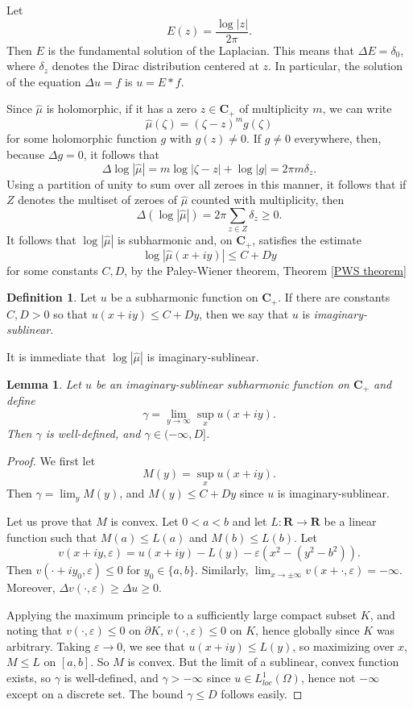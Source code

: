 \documentclass[12pt]{report}
\newcommand{\RR}{\mathbf{R}}
\newcommand{\CC}{\mathbf{C}}
\newcommand{\dfn}[1]{\emph{#1}\index{#1}}
\newtheorem{lemma}[theorem]{Lemma}
\theoremstyle{definition}
\newtheorem{definition}[theorem]{Definition}
\begin{document}
Let
$$E(z) = \frac{\log |z|}{2\pi}.$$
Then $E$ is the fundamental solution of the Laplacian. This means that $\Delta E = \delta_0$, where $\delta_z$ denotes the Dirac distribution centered at $z$. In particular, the solution of the equation $\Delta u = f$ is $u = E*f$.

Since $\hat \mu$ is holomorphic, if it has a zero $z \in \CC_+$ of multiplicity $m$, we can write
$$\hat \mu(\zeta) = (\zeta - z)^m g(\zeta)$$
for some holomorphic function $g$ with $g(z) \neq 0$. If $g \neq 0$ everywhere, then, because $\Delta g = 0$, it follows that
$$\Delta \log |\hat \mu| = m\log |\zeta - z| + \log |g| = 2\pi m \delta_z.$$
Using a partition of unity to sum over all zeroes in this manner, it follows that if $Z$ denotes the multiset of zeroes of $\hat \mu$ counted with multiplicity, then
$$\Delta(\log |\hat \mu|) = 2\pi \sum_{z \in Z} \delta_z \geq 0.$$
It follows that $\log |\hat \mu|$ is subharmonic and, on $\CC_+$, satisfies the estimate
$$\log |\hat \mu(x + iy)| \leq C + Dy$$
for some constants $C, D$, by the Paley-Wiener theorem, Theorem \ref{PWS theorem}

\begin{definition}
    Let $u$ be a subharmonic function on $\CC_+$. If there are constants $C, D > 0$ so that $u(x + iy) \leq C + Dy$, then we say that $u$ is \dfn{imaginary-sublinear}.
\end{definition}
It is immediate that $\log |\hat \mu|$ is imaginary-sublinear.

\begin{lemma}
    \label{imaginary sublinear limit}
    Let $u$ be an imaginary-sublinear subharmonic function on $\CC_+$ and define
    $$\gamma = \lim_{y \to \infty} \sup_x u(x + iy).$$
    Then $\gamma$ is well-defined, and $\gamma \in (-\infty, D]$.
\end{lemma}
\begin{proof}
    We first let
    $$M(y) = \sup_x u(x + iy).$$
    Then $\gamma = \lim_y M(y)$, and $M(y) \leq C + Dy$ since $u$ is imaginary-sublinear.

    Let us prove that $M$ is convex. Let $0 < a < b$ and let $L: \RR \to \RR$ be a linear function such that $M(a) \leq L(a)$ and $M(b) \leq L(b)$. Let
    $$v(x + iy, \varepsilon) = u(x + iy) - L(y) - \varepsilon(x^2 - (y^2 - b^2)).$$
    Then $v(\cdot + iy_0, \varepsilon) \leq 0$ for $y_0 \in \{a, b\}$. Similarly, $\lim_{x \to \pm \infty} v(x + \cdot, \varepsilon) = -\infty$. Moreover, $\Delta v(\cdot, \varepsilon) \geq \Delta u \geq 0$.

    Applying the maximum principle to a sufficiently large compact subset $K$, and noting that $v(\cdot, \varepsilon) \leq 0$ on $\partial K$, $v(\cdot, \varepsilon) \leq 0$ on $K$, hence globally since $K$ was arbitrary. Taking $\varepsilon \to 0$, we see that $u(x + iy) \leq L(y)$, so maximizing over $x$, $M \leq L$ on $[a, b]$. So $M$ is convex. But the limit of a sublinear, convex function exists, so $\gamma$ is well-defined, and $\gamma > -\infty$ since $u \in L^1_{loc}(\Omega)$, hence not $-\infty$ except on a discrete set. The bound $\gamma \leq D$ follows easily.
\end{proof}
\end{document}
